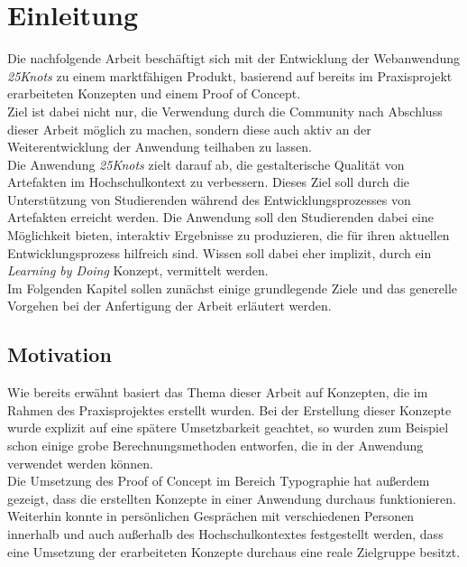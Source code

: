 \chapter{Einleitung}
\thispagestyle{fancy}
Die nachfolgende Arbeit beschäftigt sich mit der Entwicklung der Webanwendung \textit{25Knots} zu einem marktfähigen Produkt, basierend auf bereits im Praxisprojekt erarbeiteten Konzepten und einem Proof of Concept.\\
Ziel ist dabei nicht nur, die Verwendung durch die Community\footnotemark{} nach Abschluss dieser Arbeit möglich zu machen, sondern diese auch aktiv an der Weiterentwicklung der Anwendung teilhaben zu lassen.\\

Die Anwendung \textit{25Knots} zielt darauf ab, die gestalterische Qualität von Artefakten im Hochschulkontext zu verbessern. Dieses Ziel soll durch die Unterstützung von Studierenden während des Entwicklungsprozesses von Artefakten erreicht werden. Die Anwendung soll den Studierenden dabei eine Möglichkeit bieten, interaktiv Ergebnisse zu produzieren, die für ihren aktuellen Entwicklungsprozess hilfreich sind. Wissen soll dabei eher implizit, durch ein \textit{Learning by Doing} Konzept, vermittelt werden.\\

Im Folgenden Kapitel sollen zunächst einige grundlegende Ziele und das generelle Vorgehen bei der Anfertigung der Arbeit erläutert werden.


\section{Motivation}
Wie bereits erwähnt basiert das Thema dieser Arbeit auf Konzepten, die im Rahmen des Praxisprojektes  erstellt wurden. Bei der Erstellung dieser Konzepte wurde explizit auf eine spätere Umsetzbarkeit geachtet, so wurden zum Beispiel schon einige grobe Berechnungsmethoden entworfen, die in der Anwendung verwendet werden können.\\
Die Umsetzung des Proof of Concept im Bereich Typographie hat außerdem gezeigt, dass die erstellten Konzepte in einer Anwendung durchaus funktionieren.\\
Weiterhin konnte in persönlichen Gesprächen mit verschiedenen Personen innerhalb und auch außerhalb des Hochschulkontextes festgestellt werden, dass eine Umsetzung der erarbeiteten Konzepte durchaus eine reale Zielgruppe besitzt.\\

